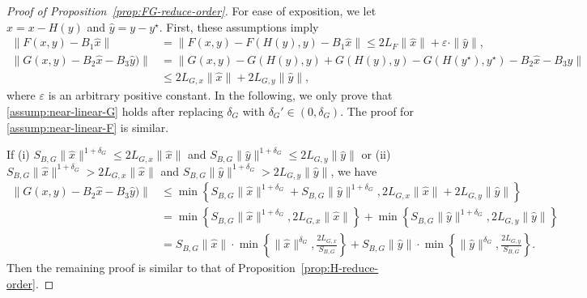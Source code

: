 \documentclass[11pt]{article}
\theoremstyle{plain}
\theoremstyle{definition}
\def\LGx{{L}_{G,x}}
\def\LGy{{L}_{G,y}}
\def\Gsmooth{{\delta_G}}
\def\SBG{{S}_{B,G}}
\def\eps{{\varepsilon}}
\newcommand{\xhat}{{\hat{x}}}
\newcommand{\yhat}{{\hat{y}}}
\newcommand{\xx}{{x}}
\newcommand{\yy}{{y}}
\begin{document}
\begin{appendix}
\begin{proof}[Proof of Proposition~\ref{prop:FG-reduce-order}]
For ease of exposition,  we let $\xhat = \xx - H(\yy)$ and $\yhat = \yy - \yy^\star$.
First, these assumptions imply
\begin{align*}
    \|F(\xx, \yy) - B_1 \xhat \| 
    & = \|F(\xx, \yy) - F(H(\yy), \yy) - B_1 \xhat  \| \le 2 L_F \| \xhat \| + \eps \cdot \| \yhat \|, \\
    \| G(\xx, \yy) - B_2 \xhat - B_3 \yhat ) \| 
    & = \| G(\xx, \yy) - G(H(\yy), \yy) + G(H(\yy), \yy) - G(H(\yy^\star), \yy^\star) {-} B_2 \xhat {-} B_3 \yhat \| \\
    & \le 2 \LGx \| \xhat \| + 2 \LGy \| \yhat \|,
\end{align*} 
where $\eps$ is an arbitrary positive constant.
In the following, we only prove that \eqref{assump:near-linear-G} holds after  replacing $\Gsmooth$ with $\Gsmooth' \in (0, \Gsmooth)$.
The proof for \eqref{assump:near-linear-F} is similar.

If (i) $ \SBG \| \xhat \|^{1+\Gsmooth} \le 2 \LGx \| \xhat \| $ and $\SBG \| 
\yhat \|^{1+\Gsmooth} \le 2 \LGy \| \yhat \| $ 
or (ii) $ \SBG \| \xhat \|^{1+\Gsmooth} > 2 \LGx \| \xhat \| $ and $\SBG \| 
\yhat \|^{1+\Gsmooth} > 2 \LGy \| \yhat \| $,
we have
\begin{align*}
    \| G(\xx, \yy) - B_2 \xhat - B_3 \yhat ) \|
    & \le \min \left\{ \SBG \| \xhat \|^{1+\Gsmooth} + \SBG \| \yhat \|^{1+\Gsmooth}, 2 \LGx \| \xhat \| + 2 \LGy \| \yhat \| \right\} \\
    & = \min \left\{ \SBG \| \xhat \|^{1+\Gsmooth}, 2 \LGx \| \xhat \| \right\} + \min \left\{ \SBG \| \yhat \|^{1+\Gsmooth}, 2 \LGy \| \yhat \|  \right\} \\
    & = \SBG \| \xhat \| \cdot \min\left\{ \| \xhat \|^\Gsmooth, \frac{2 \LGx}{\SBG} \right\} + \SBG \| \yhat \| \cdot \min \left\{ \| \yhat \|^{\Gsmooth}, \frac{2\LGy}{\SBG} \right\}.
\end{align*}
Then the remaining proof is similar to that of Proposition~\ref{prop:H-reduce-order}.


\end{proof}
\end{appendix}
\end{document}
